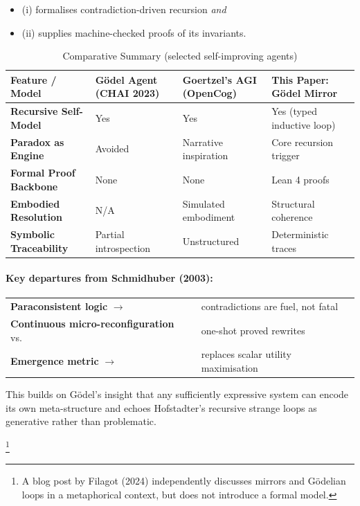 \documentclass[manuscript,nonacm]{acmart}
\begin{document}
\begin{itemize}
\item (i) formalises contradiction-driven recursion \textit{and}
\item (ii) supplies machine-checked proofs of its invariants.
\end{itemize}
\begin{table}[H]
  \caption{Comparative Summary (selected self-improving agents)}
  \label{tab:comparison}
  \begin{tabular}{@{}llll@{}}
    \toprule
    \textbf{Feature / Model} & \textbf{Gödel Agent (CHAI 2023)} & \textbf{Goertzel's AGI (OpenCog)} & \textbf{This Paper: Gödel Mirror} \\
    \midrule
    \textbf{Recursive Self-Model} & Yes & Yes & Yes (typed inductive loop) \\
    \textbf{Paradox as Engine} & Avoided & Narrative inspiration & Core recursion trigger \\
    \textbf{Formal Proof Backbone} & None & None & Lean 4 proofs \\
    \textbf{Embodied Resolution} & N/A & Simulated embodiment & Structural coherence \\
    \textbf{Symbolic Traceability} & Partial introspection & Unstructured & Deterministic traces \\
    \bottomrule
  \end{tabular}
\end{table}

\paragraph{Key departures from Schmidhuber (2003):}
\begin{tabular}{@{}l l@{}}
\textbf{Paraconsistent logic} $\rightarrow$ &
  contradictions are fuel, not fatal \\[2pt]
\textbf{Continuous micro-reconfiguration} vs.\ &
  one-shot proved rewrites \\[2pt]
\textbf{Emergence metric} $\rightarrow$ &
  replaces scalar utility maximisation
\end{tabular}

This builds on Gödel's insight that any sufficiently expressive system can encode its own meta-structure and echoes Hofstadter's recursive strange loops as generative rather than problematic.

\footnote{A blog post by Filagot (2024) independently discusses mirrors and Gödelian loops in a metaphorical context, but does not introduce a formal model.}
\end{document}
